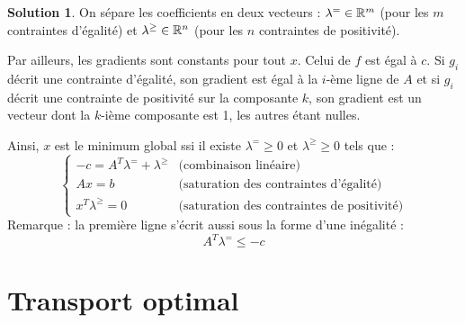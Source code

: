 \documentclass[a4paper,francais]{article}
\newcommand{\R}{{\ensuremath\mathbb{R}}}
\theoremstyle{definition}
\newtheorem*{solution}{Solution}
\begin{document}
\begin{solution}
  On sépare les coefficients en deux vecteurs :
  $\lambda^= \in \R^m$ (pour les $m$ contraintes d'égalité) et
  $\lambda^\geq \in \R^n$ (pour les $n$ contraintes de positivité).

  Par ailleurs, les gradients sont constants pour tout $x$.
  Celui de $f$ est égal à $c$.
  Si $g_i$ décrit une contrainte d'égalité, son gradient est
  égal à la $i$-ème ligne de $A$ et si $g_i$ décrit une
  contrainte de positivité sur la composante $k$, son gradient
  est un vecteur dont la $k$-ième composante est 1, les autres
  étant nulles. 
  
  Ainsi, $x$ est le minimum global ssi il existe
  $\lambda^= \geq 0$ et $\lambda^\geq \geq 0$ tels que : 
  \[
  \left\{
  \begin{array}{ll}
    -c =  A^T \lambda^= + \lambda^\geq  & \text{(combinaison linéaire)} \\
    Ax = b & \text{(saturation des contraintes d'égalité)} \\
    x^T \lambda^\geq = 0 & \text{(saturation des contraintes de positivité)} 
  \end{array}
  \right.
  \]
  Remarque : la première ligne s'écrit aussi sous la forme d'une inégalité  :
  \[
  A^T \lambda^= \leq -c
  \]
\end{solution}

\section{Transport optimal}



\end{document}
